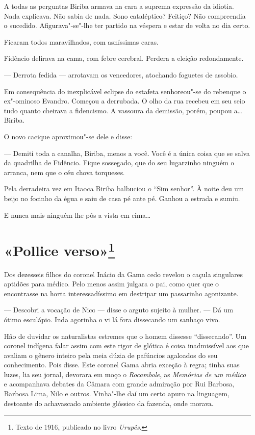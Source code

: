 A todas as perguntas Biriba armava na cara a suprema expressão da
idiotia. Nada explicava. Não sabia de nada. Sono cataléptico? Feitiço?
Não compreendia o sucedido. Afigurava"-se"-lhe ter partido na véspera e
estar de volta no dia certo.

Ficaram todos maravilhados, com asníssimas caras.

Fidêncio delirava na cama, com febre cerebral. Perdera a eleição
redondamente.

--- Derrota fedida --- arrotavam os vencedores, atochando foguetes de
assobio.

Em consequência do inexplicável eclipse do estafeta senhoreou"-se do
rebenque o ex"-ominoso Evandro. Começou a derrubada. O olho da rua
recebeu em seu seio tudo quanto cheirava a fidencismo. A vassoura da
demissão, porém, poupou a\ldots{} Biriba.

O novo cacique aproximou"-se dele e disse:

--- Demiti toda a canalha, Biriba, menos a você. Você é a única coisa
que se salva da quadrilha de Fidêncio. Fique sossegado, que do seu
lugarzinho ninguém o arranca, nem que o céu chova torqueses.

Pela derradeira vez em Itaoca Biriba balbuciou o ``Sim senhor''. À noite
deu um beijo no focinho da égua e saiu de casa pé ante pé. Ganhou a
estrada e sumiu.

E nunca mais ninguém lhe pôs a vista em cima\ldots{}

\chapter{«Pollice verso»\footnote[*]{Texto de 1916, publicado no livro \emph{Urupês}.}}

Dos dezesseis filhos do coronel Inácio da Gama cedo revelou o caçula
singulares aptidões para médico. Pelo menos assim julgara o pai, como
quer que o encontrasse na horta interessadíssimo em destripar um
passarinho agonizante.

--- Descobri a vocação de Nico --- disse o arguto sujeito à mulher. ---
Dá um ótimo esculápio. Inda agorinha o vi lá fora dissecando um sanhaço
vivo.

Hão de duvidar os naturalistas estremes que o homem dissesse
``dissecando''. Um coronel indígena falar assim com este rigor de
glótica é coisa inadmissível aos que avaliam o gênero inteiro pela meia
dúzia de pafúncios agaloados do seu conhecimento. Pois disse. Este
coronel Gama abria exceção à regra; tinha suas luzes, lia seu jornal,
devorara em moço o \emph{Rocambole}, as \emph{Memórias de um médico} e
acompanhava debates da Câmara com grande admiração por Rui Barbosa,
Barbosa Lima, Nilo e outros. Vinha"-lhe daí um certo apuro na linguagem,
destoante do achavascado ambiente glóssico da fazenda, onde morava.

